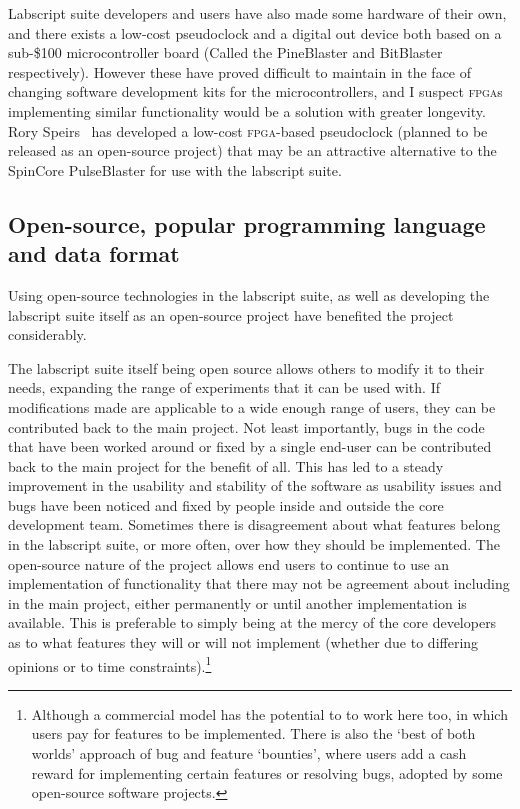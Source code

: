 Labscript suite developers and users have also made some hardware of their own, and there exists a low-cost pseudoclock and a digital out device both based on a sub-\$100 microcontroller board (Called the PineBlaster and BitBlaster respectively). However these have proved difficult to maintain in the face of changing software development kits for the microcontrollers, and I suspect \textsc{fpga}s implementing similar functionality would be a solution with greater longevity. Rory Speirs~\cite{speirs__2018-1} has developed a low-cost \textsc{fpga}-based pseudoclock (planned to be released as an open-source project) that may be an attractive alternative to the SpinCore PulseBlaster for use with the labscript suite.

\subsection{Open-source, popular programming language and data format}

Using open-source technologies in the labscript suite, as well as developing the labscript suite itself as an open-source project have benefited the project considerably.

The labscript suite itself being open source allows others to modify it to their needs, expanding the range of experiments that it can be used with. If modifications made are applicable to a wide enough range of users, they can be contributed back to the main project. Not least importantly, bugs in the code that have been worked around or fixed by a single end-user can be contributed back to the main project for the benefit of all. This has led to a steady improvement in the usability and stability of the software as usability issues and bugs have been noticed and fixed by people inside and outside the core development team. Sometimes there is disagreement about what features belong in the labscript suite, or more often, over how they should be implemented. The open-source nature of the project allows end users to continue to use an implementation of functionality that there may not be agreement about including in the main project, either permanently or until another implementation is available. This is preferable to simply being at the mercy of the core developers as to what features they will or will not implement (whether due to differing opinions or to time constraints).\footnote{Although a commercial model has the potential to to work here too, in which users pay for features to be implemented. There is also the `best of both worlds' approach of bug and feature `bounties', where users add a cash reward for implementing certain features or resolving bugs, adopted by some open-source software projects.}

